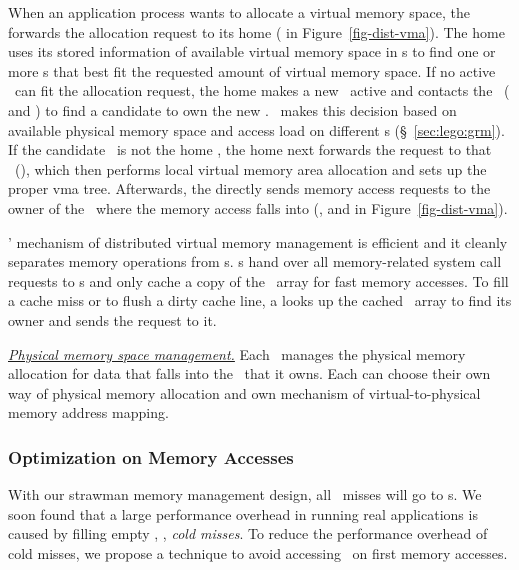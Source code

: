 When an application process wants to allocate a virtual memory space,
the \pcomponent{} forwards the allocation request 
to its home \mcomponent{} ( in Figure~\ref{fig-dist-vma}).
The home \mcomponent{} uses its stored information of available virtual memory space in \vregion{}s
to find one or more \vregion{}s that best fit the requested amount of virtual memory space.
If no active \vregion\ can fit the allocation request, the home \mcomponent{} makes a new \vregion\ active and 
contacts the \gmm\ ( and ) to find a candidate \mcomponent{} to own the new \vregion.
\gmm\ makes this decision based on available physical memory space and access load on different \mcomponent{}s (\S~\ref{sec:lego:grm}).
If the candidate \mcomponent\ is not the home \mcomponent{}, the home \mcomponent{} next forwards the request to that \mcomponent\ (),
which then performs local virtual memory area allocation and sets up the proper vma tree. 
Afterwards, the \pcomponent{} directly sends memory access requests to the owner of the \vregion\ where the memory access falls into
(\eg,  and  in Figure~\ref{fig-dist-vma}).


\lego' mechanism of distributed virtual memory management is efficient and it cleanly separates memory operations from \pcomponent{}s.
\pcomponent{}s hand over all memory-related system call requests to \mcomponent{}s
and only cache a copy of the \vregion\ array for fast memory accesses.
To fill a cache miss or to flush a dirty cache line, 
a \pcomponent{} looks up the cached \vregion\ array to find its owner \mcomponent{} and sends the request to it.

\textit{\uline{Physical memory space management.}}
Each \mcomponent\ manages the physical memory allocation for data that falls into the
\vregion\ that it owns.
Each \mcomponent{} can choose their own way of physical memory allocation
and own mechanism of virtual-to-physical memory address mapping.


\subsubsection{Optimization on Memory Accesses}
\label{sec:lego:zerofill}
With our strawman memory management design, 
all \excache\ misses will go to \mcomponent{}s.
We soon found that a large performance overhead in running real applications 
is caused by filling empty \excache, \ie, {\em cold misses}.
To reduce the performance overhead of cold misses, we propose a technique 
to avoid accessing \mcomponent\ on first memory accesses.

